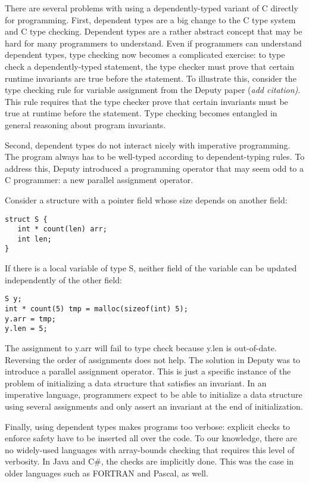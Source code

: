 There are several problems with using a dependently-typed variant of C
directly for programming. First, dependent types are a big change to the
C type system and C type checking. Dependent types are a rather abstract
concept that may be hard for many programmers to understand. Even if
programmers can understand dependent types, type checking now becomes a
complicated exercise: to type check a dependently-typed statement, the
type checker must prove that certain runtime invariants are true before
the statement. To illustrate this, consider the type checking rule for
variable assignment from the Deputy paper (\emph{add citation)}. This
rule requires that the type checker prove that certain invariants must
be true at runtime before the statement. Type checking becomes entangled
in general reasoning about program invariants.

Second, dependent types do not interact nicely with imperative
programming. The program always has to be well-typed according to
dependent-typing rules. To address this, Deputy introduced a programming
operator that may seem odd to a C programmer: a new parallel assignment
operator.

Consider a structure with a pointer field whose size depends on another
field:
\begin{verbatim}
struct S {
   int * count(len) arr;
   int len;
}
\end{verbatim}

If there is a local variable of type S, neither field of the variable
can be updated independently of the other field:

\begin{verbatim}
S y;
int * count(5) tmp = malloc(sizeof(int) 5);
y.arr = tmp;
y.len = 5;
\end{verbatim}

The assignment to y.arr will fail to type check because y.len is
out-of-date. Reversing the order of assignments does not help. The
solution in Deputy was to introduce a parallel assignment operator. This
is just a specific instance of the problem of initializing a data
structure that satisfies an invariant. In an imperative language,
programmers expect to be able to initialize a data structure using
several assignments and only assert an invariant at the end of
initialization.

Finally, using dependent types makes programs too verbose: explicit
checks to enforce safety have to be inserted all over the code. To our
knowledge, there are no widely-used languages with array-bounds checking
that requires this level of verbosity. In Java and C\#, the checks are
implicitly done. This was the case in older languages such as FORTRAN
and Pascal, as well.

